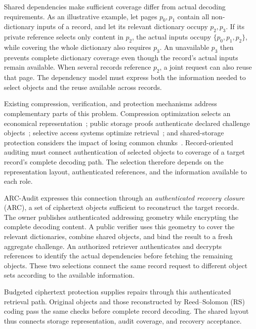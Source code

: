\documentclass[10pt,journal]{IEEEtran}
\begin{document}
Shared dependencies make sufficient coverage differ from actual decoding
requirements. As an illustrative example, let pages $p_0,p_1$ contain all
non-dictionary inputs of a record, and let its relevant dictionary occupy
$p_2,p_3$. If its private reference selects only content in $p_2$, the actual
inputs occupy $\{p_0,p_1,p_2\}$, while covering the whole dictionary also
requires $p_3$. An unavailable $p_3$ then prevents complete dictionary coverage
even though the record's actual inputs remain available. When several records
reference $p_2$, a joint request can also reuse that page. The dependency model
must express both the information needed to select objects and the reuse
available across records.

Existing compression, verification, and protection mechanisms address
complementary parts of this problem. Compression optimization selects an
economical representation~\cite{Hurst2024GreedyGD}; public storage proofs
authenticate declared challenge objects~\cite{ShachamWaters2013}; selective
access systems optimize retrieval~\cite{Taurone2024TREAT}; and shared-storage
protection considers the impact of losing common chunks~\cite{Bhagwat2006Reliability}.
Record-oriented auditing must connect authentication of selected objects
to coverage of a target record's complete decoding path. The selection
therefore depends on the representation layout, authenticated references,
and the information available to each role.

ARC-Audit expresses this connection through an \emph{authenticated recovery
closure} (ARC), a set of ciphertext objects sufficient to reconstruct the
target records. The owner publishes authenticated addressing geometry while
encrypting the complete decoding content. A public verifier uses this geometry
to cover the relevant dictionaries, combine shared objects, and bind the
result to a fresh aggregate challenge. An authorized retriever authenticates
and decrypts references to identify the actual dependencies before fetching
the remaining objects. These two selections connect the same record request
to different object sets according to the available information.

Budgeted ciphertext protection supplies repairs through this authenticated
retrieval path. Original objects and those reconstructed by Reed--Solomon (RS)
coding pass the same checks
before complete record decoding. The shared layout thus connects storage
representation, audit coverage, and recovery acceptance.
\end{document}
